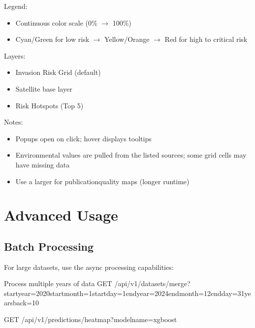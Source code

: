 \documentclass[letterpaper,10pt,english]{sphinxmanual}
\begin{document}
\sphinxAtStartPar
Legend:
\begin{itemize}
\item {} 
\sphinxAtStartPar
Continuous color scale (0\% \(\rightarrow\) 100\%)

\item {} 
\sphinxAtStartPar
Cyan/Green for low risk \(\rightarrow\) Yellow/Orange \(\rightarrow\) Red for high to critical risk

\end{itemize}

\sphinxAtStartPar
Layers:
\begin{itemize}
\item {} 
\sphinxAtStartPar
Invasion Risk Grid (default)

\item {} 
\sphinxAtStartPar
Satellite base layer

\item {} 
\sphinxAtStartPar
Risk Hotspots (Top 5)

\end{itemize}

\sphinxAtStartPar
Notes:
\begin{itemize}
\item {} 
\sphinxAtStartPar
Popups open on click; hover displays tooltips

\item {} 
\sphinxAtStartPar
Environmental values are pulled from the listed sources; some grid cells may have missing data

\item {} 
\sphinxAtStartPar
Use a larger  for publication\sphinxhyphen{}quality maps (longer runtime)

\end{itemize}


\section{Advanced Usage}
\label{\detokenize{user_guide:advanced-usage}}

\subsection{Batch Processing}
\label{\detokenize{user_guide:batch-processing}}
\sphinxAtStartPar
For large datasets, use the async processing capabilities:

\begin{sphinxVerbatim}[commandchars=\\\{\}]
\PYGZsh{} Process multiple years of data
GET /api/v1/datasets/merge?start\PYGZus{}year=2020\PYGZam{}start\PYGZus{}month=1\PYGZam{}start\PYGZus{}day=1\PYGZam{}end\PYGZus{}year=2024\PYGZam{}end\PYGZus{}month=12\PYGZam{}end\PYGZus{}day=31\PYGZam{}years\PYGZus{}back=10

GET /api/v1/predictions/heatmap?model\PYGZus{}name=xgboost
\end{sphinxVerbatim}
\end{document}
